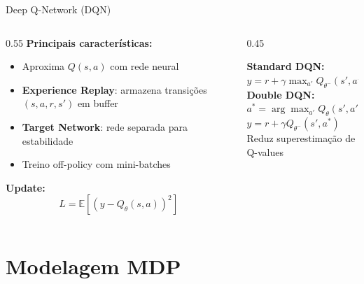 \documentclass[11pt, xcolor=dvipsnames]{beamer}
\newcommand{\destaque}[1]{\textbf{\textcolor{verde}{#1}}}
\newcommand{\sutil}[1]{\textcolor{textoBase!60}{#1}}
\begin{document}
\begin{frame}{Deep Q-Network (DQN)}
  \footnotesize
  \begin{columns}[T]
    \begin{column}{0.55\textwidth}
      \textbf{Principais características:}
      \begin{itemize}
        \item Aproxima $Q(s,a)$ com rede neural
        \item \destaque{Experience Replay}: armazena transições $(s, a, r, s')$ em buffer
        \item \destaque{Target Network}: rede separada para estabilidade
        \item Treino off-policy com mini-batches
      \end{itemize}
      \vspace{2mm}
      \textbf{Update:}
      \[
        L = \mathbb{E}\left[(y - Q_\theta(s,a))^2\right]
      \]
    \end{column}
    \begin{column}{0.45\textwidth}
      \begin{alertbox}
        {\scriptsize
        \textbf{Standard DQN:} \\
        $y = r + \gamma \max_{a'} Q_{\theta^-}(s', a')$ \\[3mm]
        \textbf{Double DQN:} \\
        $a^* = \arg\max_{a'} Q_\theta(s', a')$ \\
        $y = r + \gamma Q_{\theta^-}(s', a^*)$ \\[2mm]
        \sutil{Reduz superestimação de Q-values}
        }
      \end{alertbox}
    \end{column}
  \end{columns}
\end{frame}

\section{Modelagem MDP}
\end{document}
